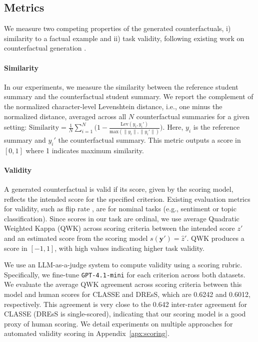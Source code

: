 \documentclass[11pt]{article}
\begin{document}
\subsection{Metrics}
We measure two competing properties of the generated counterfactuals, i) similarity to a factual example and ii) task validity, following existing work on counterfactual generation \cite{wang-etal-2024-survey}. 

\paragraph{Similarity}
In our experiments, we measure the similarity between the reference student summary and the counterfactual student summary. We report the complement of the normalized character-level Levenshtein distance, i.e., one minus the normalized distance, averaged across all $N$ counterfactual summaries for a given setting:
$\text{Similarity}=\frac{1}{N}\sum_{i=1}^N \big(1 -\frac{\text{Lev}(y_i, y_i')}{\text{max}(\lVert y_i \rVert, \lVert y_i' \rVert)}\big).$
Here, $y_i$ is the reference summary and $y_i'$ the counterfactual summary. This metric outputs a score in $[0,1]$ where 1 indicates maximum similarity.

\paragraph{Validity}
A generated counterfactual is valid if its score, given by the scoring model, reflects the intended score for the specified criterion. Existing evaluation metrics for validity, such as flip rate \cite{ross-etal-2021-explaining}, are for nominal tasks (e.g., sentiment or topic classification). Since scores in our task are ordinal, we use average Quadratic Weighted Kappa (QWK) across scoring criteria between the intended score $z'$ and an estimated score from the scoring model $s(\mathbf{y}')=\hat{z}'$. QWK produces a score in $[-1,1]$, with high values indicating higher task validity. 

We use an LLM-as-a-judge \cite{li_generation_2025} system to compute validity using a scoring rubric. Specifically, we fine-tune \texttt{GPT-4.1-mini} for each criterion across both datasets. We evaluate the average QWK agreement across scoring criteria between this model and human scores for CLASSE and DREsS, which are 0.6242 and 0.6012, respectively. This agreement is very close to the 0.642 inter-rater agreement for CLASSE (DREsS is single-scored), indicating that our scoring model is a good proxy of human scoring. We detail experiments on multiple approaches for automated validity scoring in Appendix~\ref{apx:scoring}.
\end{document}
